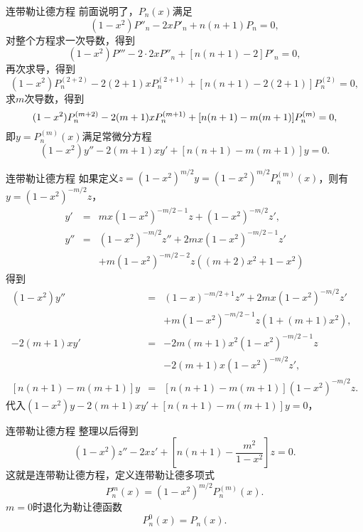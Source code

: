 \documentclass[11pt]{beamer}
\begin{document}
\begin{frame}{连带勒让德方程}
前面说明了，$P_n(x)$满足
\begin{equation}
(1-x^2)P''_n - 2xP'_n + n(n+1)P_n = 0,
\end{equation}
对整个方程求一次导数，得到
\begin{equation}
(1-x^2)P''' - 2 \cdot 2x P''_n + [n(n+1)-2]P'_n = 0,
\end{equation}
再次求导，得到
\begin{equation}
(1-x^2)P^{(2+2)}_n - 2(2+1)x P^{(2+1)}_n + [ n(n+1)- 2(2+1) ] P^{(2)}_n = 0,
\end{equation}
求$m$次导数，得到
\begin{equation}
(1-x^2)P^{(m+2)}_n - 2(m+1)x P^{(m+1)}_n + [ n(n+1)- m(m+1) ] P^{(m)}_n = 0,
\label{eqn:P^{(m+2)}_n}
\end{equation}
即$y = P^{(m)}_n(x)$满足常微分方程
\begin{equation}
(1-x^2)y'' - 2(m+1)xy' + [n(n+1)-m(m+1)] y = 0.
\end{equation}
\end{frame}

\begin{frame}{连带勒让德方程}
如果定义$z = (1-x^2)^{m/2} y = (1-x^2)^{m/2} P^{(m)}_n (x)$，则有$y = (1-x^2)^{-m/2}z$，
\begin{eqnarray}
y' &=& mx(1-x^2)^{-m/2-1} z + (1-x^2)^{-m/2} z', \nonumber\\
y'' &=& (1-x^2)^{-m/2} z'' + 2mx(1-x^2)^{-m/2-1}z'
\nonumber\\
&& + m(1-x^2)^{-m/2-2} z ( (m+2)x^2 + 1-x^2 )
\end{eqnarray}
得到
\begin{eqnarray}
(1-x^2) y'' &=& (1-x)^{-m/2+1} z'' + 2mx(1-x^2)^{-m/2}z'
\nonumber\\
&& + m(1-x^2)^{-m/2-1} z (1+(m+1)x^2), \nonumber\\
-2(m+1)xy' &=& -2m(m+1)x^2(1-x^2)^{-m/2-1} z　\nonumber\\ &&-2(m+1)x(1-x^2)^{-m/2} z', \nonumber\\
\left[n(n+1)-m(m+1)\right] y &=& [n(n+1)-m(m+1)](1-x^2)^{-m/2}z. \nonumber
\end{eqnarray}
代入$(1-x^2)y-2(m+1)xy' + [n(n+1)-m(m+1)]y = 0$，
\end{frame}

\begin{frame}{连带勒让德方程}
整理以后得到
\begin{equation}
(1-x^2)z'' - 2x z' + [ n(n+1) - \frac{m^2}{1-x^2}] z = 0.
\end{equation}
这就是连带勒让德方程，定义连带勒让德多项式
\begin{equation}
P^m_n(x) = (1-x^2)^{m/2} P^{(m)}_n(x).
\end{equation}
$m=0$时退化为勒让德函数
\begin{equation}
P^0_n(x) = P_n(x).
\end{equation}
\end{frame}
\end{document}
